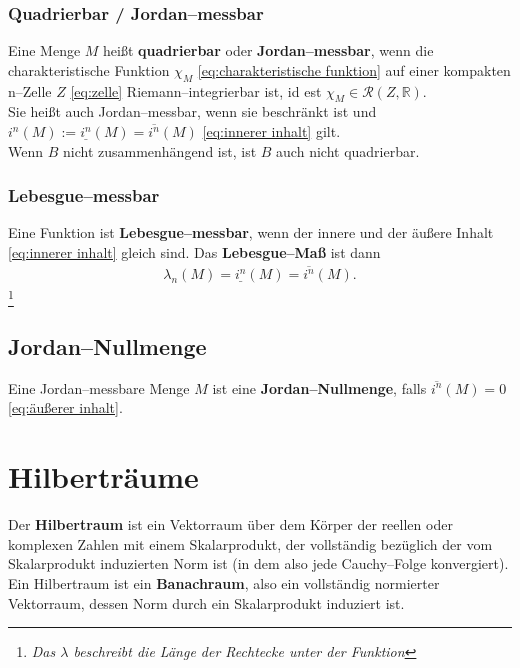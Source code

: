 \documentclass[a4paper,12pt]{article}
\numberwithin{equation}{section}
\begin{document}
\subsubsection{Quadrierbar / Jordan--messbar}
Eine Menge $M$ heißt \textbf{quadrierbar} oder \textbf{Jordan--messbar}, wenn die charakteristische Funktion $\chi _M$ \eqref{eq:charakteristische funktion} auf einer kompakten n--Zelle $Z$ \eqref{eq:zelle} Riemann--integrierbar ist, id est $\chi _M \in \mathcal{R}\left(Z,\mathbb{R}\right)$.\\\indent
Sie heißt auch Jordan--messbar, wenn sie beschränkt ist und $i^n\left(M\right):=\underline{i^n}\left(M\right)=\overline{i^n}\left(M\right)$ \eqref{eq:innerer inhalt} gilt.\\\indent
Wenn $B$ nicht zusammenhängend ist, ist $B$ auch nicht quadrierbar.

\subsubsection{Lebesgue--messbar}
Eine Funktion ist \textbf{Lebesgue--messbar}, wenn der innere und der äußere Inhalt \eqref{eq:innerer inhalt} gleich sind. Das \textbf{Lebesgue--Maß} ist dann
\begin{align} 
        \lambda _n\left(M\right)=\underline{i^n}\left(M\right)=\overline{i^n}\left(M\right)\label{eq:lebesgue--maß}
.\end{align} 
\footnote{\textit{Das $\lambda $ beschreibt die Länge der Rechtecke unter der Funktion}}


\subsection{Jordan--Nullmenge}
Eine Jordan--messbare Menge $M$ ist eine \textbf{Jordan--Nullmenge}, falls $\overline{i^n}\left(M\right)=0$ \eqref{eq:äußerer inhalt}.


\newpage
\section{Hilberträume}
Der \textbf{Hilbertraum} ist ein Vektorraum über dem Körper der reellen oder komplexen Zahlen mit einem Skalarprodukt, der vollständig bezüglich der vom Skalarprodukt induzierten Norm ist (in dem also jede Cauchy--Folge konvergiert). Ein Hilbertraum ist ein \textbf{Banachraum}, also ein vollständig normierter Vektorraum, dessen Norm durch ein Skalarprodukt induziert ist.
\end{document}
